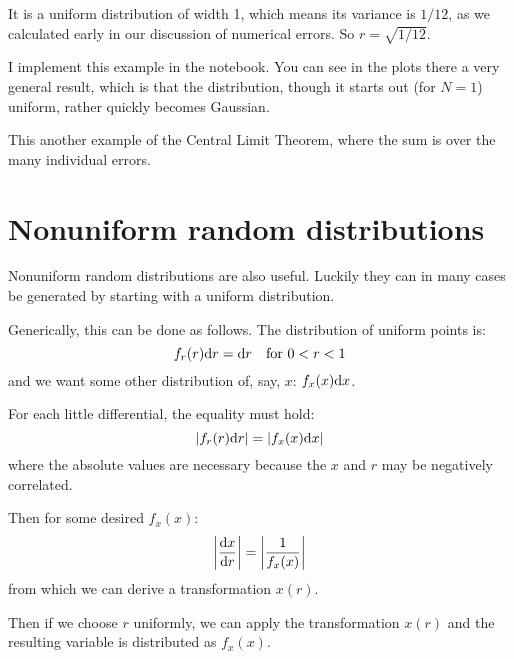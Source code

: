 
\begin{answer}
It is a uniform distribution of width 1, which means its variance is
$1/12$, as we calculated early in our discussion of numerical
errors. So $r= \sqrt{1/12}$.
\end{answer}

I implement this example in the notebook. You can see in the plots
there a very general result, which is that the distribution, though it
starts out (for $N=1$) uniform, rather quickly becomes Gaussian.


\begin{answer}
This another example of the Central Limit Theorem, where the sum is
over the many individual errors.
\end{answer}

\section{Nonuniform random distributions}

Nonuniform random distributions are also useful. Luckily they can in
many cases be generated by starting with a uniform distribution. 

Generically, this can be done as follows. The distribution of uniform
points is:
\begin{equation}
f_r(r) {\rm d}r = {\rm d}r \quad \mathrm{for~} 0 < r < 1
\end{equation}
and we want some other distribution of, say, $x$: $f_x(x) {\rm d}x$.

For each little differential, the equality must hold:
\begin{equation}
\left| f_r(r) {\rm d}r \right| = \left|f_x(x) {\rm d}x \right|
\end{equation}
where the absolute values are necessary because the $x$ and $r$ may be
negatively correlated.

Then for some desired $f_x(x)$:
\begin{equation}
\left| \frac{{\rm d}x}{{\rm d}r} \right| = \left|\frac{1}{f_x(x)}\right|
\end{equation}
from which we can derive a transformation $x(r)$.

Then if we choose $r$ uniformly, we can apply the transformation
$x(r)$ and the resulting variable is distributed as $f_x(x)$.

